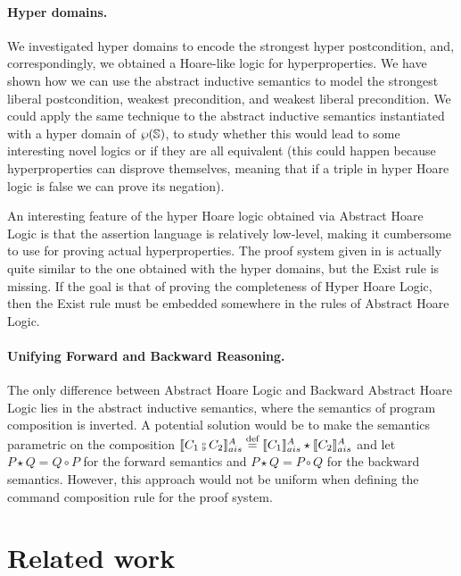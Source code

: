\documentclass[
  10pt,       %
  twoside,    %
  a4paper,    %
  english,    %
  tikz,       %
  openright,  %
]{book}
\begin{document}
\paragraph{\textbf{Hyper domains.}}
We investigated hyper domains to encode the strongest hyper postcondition,  and,
correspondingly, we obtained
a Hoare-like logic for hyperproperties. We have shown how we can use the
abstract inductive semantics to model the strongest liberal postcondition,
weakest precondition, and weakest liberal precondition. We could apply the
same technique to  the abstract inductive semantics instantiated with a hyper
domain of $\wp(\mathbb{S})$, to study whether this would  lead to some interesting novel 
logics or if
they are all equivalent (this could happen because hyperproperties can disprove themselves,
meaning that if a triple in hyper Hoare logic is false we can prove its negation).

An interesting feature of the hyper Hoare logic obtained via Abstract Hoare Logic
is that the assertion language is relatively low-level, making it cumbersome to
use for proving actual hyperproperties. The proof system given in \cite{Darnier2023}
is actually quite similar to the one obtained with the hyper domains, but the
Exist rule is missing. If the goal is that of proving the completeness of Hyper
Hoare Logic, then the Exist rule must be embedded somewhere in the rules of Abstract Hoare
Logic.

\paragraph{\textbf{Unifying Forward and Backward Reasoning.}}
The only difference between Abstract Hoare Logic and Backward Abstract Hoare
Logic lies in the abstract inductive semantics, where the semantics of program
composition is inverted. A potential solution would be to make the
semantics parametric on the composition $\asem{C_1 \fcmp C_2} \defeq \asem{C_1}
\star \asem{C_2}$ and let $P \star Q= Q \circ P$ for the forward semantics and
$P \star Q = P \circ Q$ for the backward semantics. However, this approach would not be uniform
when defining the command composition rule for the proof system.

\section{Related work}
\end{document}
